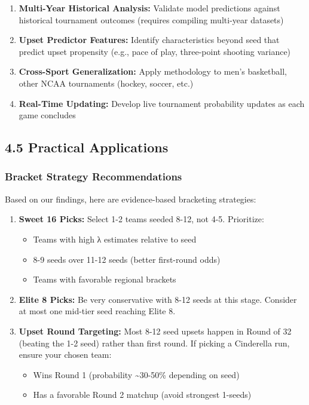 \documentclass[
]{article}
\providecommand{\tightlist}{%
  \setlength{\itemsep}{0pt}\setlength{\parskip}{0pt}}
\begin{document}
\begin{enumerate}
\def\labelenumi{\arabic{enumi}.}
\item
  \textbf{Multi-Year Historical Analysis:} Validate model predictions
  against historical tournament outcomes (requires compiling multi-year
  datasets)
\item
  \textbf{Upset Predictor Features:} Identify characteristics beyond
  seed that predict upset propensity (e.g., pace of play, three-point
  shooting variance)
\item
  \textbf{Cross-Sport Generalization:} Apply methodology to men's
  basketball, other NCAA tournaments (hockey, soccer, etc.)
\item
  \textbf{Real-Time Updating:} Develop live tournament probability
  updates as each game concludes
\end{enumerate}

\subsection{4.5 Practical Applications}\label{practical-applications}

\subsubsection{Bracket Strategy
Recommendations}\label{bracket-strategy-recommendations}

Based on our findings, here are evidence-based bracketing strategies:

\begin{enumerate}
\def\labelenumi{\arabic{enumi}.}
\item
  \textbf{Sweet 16 Picks:} Select 1-2 teams seeded 8-12, not 4-5.
  Prioritize:

  \begin{itemize}
  \tightlist
  \item
    Teams with high λ estimates relative to seed
  \item
    8-9 seeds over 11-12 seeds (better first-round odds)
  \item
    Teams with favorable regional brackets
  \end{itemize}
\item
  \textbf{Elite 8 Picks:} Be very conservative with 8-12 seeds at this
  stage. Consider at most one mid-tier seed reaching Elite 8.
\item
  \textbf{Upset Round Targeting:} Most 8-12 seed upsets happen in Round
  of 32 (beating the 1-2 seed) rather than first round. If picking a
  Cinderella run, ensure your chosen team:

  \begin{itemize}
  \tightlist
  \item
    Wins Round 1 (probability \textasciitilde30-50\% depending on seed)
  \item
    Has a favorable Round 2 matchup (avoid strongest 1-seeds)
  \end{itemize}
\end{enumerate}
\end{document}
